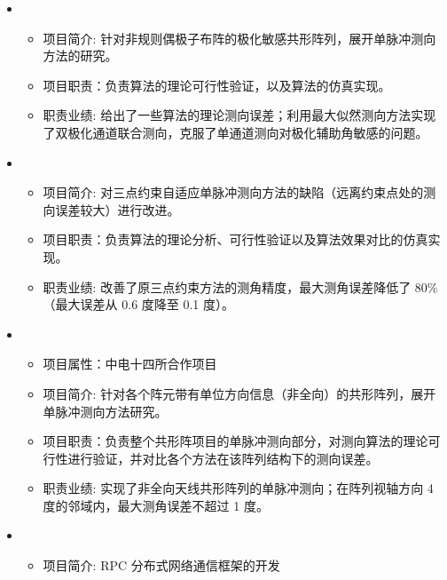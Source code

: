   \begin{itemize}[leftmargin=*]
    \item
      {\small
      \begin{itemize}
        \item 项目简介: 针对非规则偶极子布阵的极化敏感共形阵列，展开单脉冲测向方法的研究。
        \item 项目职责：负责算法的理论可行性验证，以及算法的仿真实现。
        \item 职责业绩: 给出了一些算法的理论测向误差；利用最大似然测向方法实现了双极化通道联合测向，克服了单通道测向对极化辅助角敏感的问题。
      \end{itemize}
        }
    \item
      {\small
      \begin{itemize}
        \item 项目简介: 对三点约束自适应单脉冲测向方法的缺陷（远离约束点处的测向误差较大）进行改进。
        \item 项目职责：负责算法的理论分析、可行性验证以及算法效果对比的仿真实现。
        \item 职责业绩: 改善了原三点约束方法的测角精度，最大测角误差降低了 80\%（最大误差从 0.6 度降至 0.1 度）。
      \end{itemize}
      }
    \item
    {\small
    \begin{itemize}
      \item 项目属性：中电十四所合作项目
      \item 项目简介: 针对各个阵元带有单位方向信息（非全向）的共形阵列，展开单脉冲测向方法研究。
      \item 项目职责：负责整个共形阵项目的单脉冲测向部分，对测向算法的理论可行性进行验证，并对比各个方法在该阵列结构下的测向误差。
      \item 职责业绩: 实现了非全向天线共形阵列的单脉冲测向；在阵列视轴方向 4 度的邻域内，最大测角误差不超过 1 度。
    \end{itemize}
    }
    \item 
    {\small
    \begin{itemize}
      \item 项目简介: RPC 分布式网络通信框架的开发

\end{itemize}}
\end{itemize}
